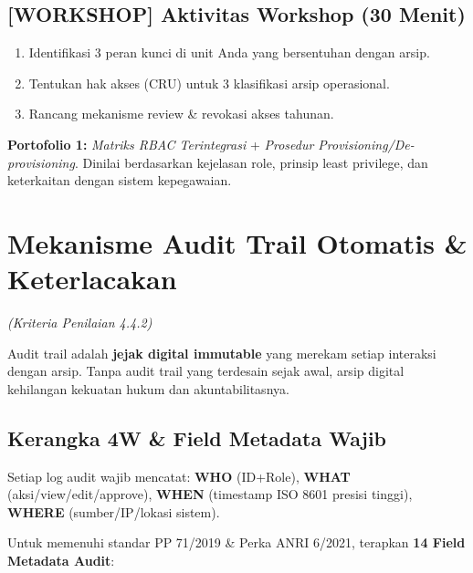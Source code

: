 \documentclass[12pt,a4paper]{report}
\begin{document}
\section*{[WORKSHOP] Aktivitas Workshop (30 Menit)}
\begin{enumerate}[leftmargin=*]
    \item Identifikasi 3 peran kunci di unit Anda yang bersentuhan dengan arsip.
    \item Tentukan hak akses (CRU) untuk 3 klasifikasi arsip operasional.
    \item Rancang mekanisme review & revokasi akses tahunan.
\end{enumerate}

\begin{outputbox}
[DONE] \textbf{Portofolio 1:} \textit{Matriks RBAC Terintegrasi} + \textit{Prosedur Provisioning/De-provisioning}. Dinilai berdasarkan kejelasan role, prinsip least privilege, dan keterkaitan dengan sistem kepegawaian.
\end{outputbox}

\newpage
\chapter{Mekanisme Audit Trail Otomatis \& Keterlacakan}
\textit{(Kriteria Penilaian 4.4.2)}

Audit trail adalah \textbf{jejak digital immutable} yang merekam setiap interaksi dengan arsip. Tanpa audit trail yang terdesain sejak awal, arsip digital kehilangan kekuatan hukum dan akuntabilitasnya.

\section{Kerangka 4W \& Field Metadata Wajib}
Setiap log audit wajib mencatat: \textbf{WHO} (ID+Role), \textbf{WHAT} (aksi/view/edit/approve), \textbf{WHEN} (timestamp ISO 8601 presisi tinggi), \textbf{WHERE} (sumber/IP/lokasi sistem).

Untuk memenuhi standar PP 71/2019 \& Perka ANRI 6/2021, terapkan \textbf{14 Field Metadata Audit}:
\end{document}

